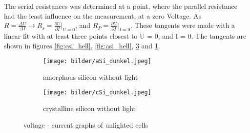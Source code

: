 The serial resistances was determined at a point,
where the parallel resistance had the least influence on the measurement, at a zero Voltage.
As $R = \frac{\Delta U}{\Delta I} \rightarrow R_s = \frac{\partial U}{\partial I}|_{U = 0}$,
and $R_P = \frac{\partial U}{\partial I}|_{I = 0}$.
These tangents were made with a linear fit with at least three points closest to
U = 0, and I = 0.
The tangents are shown in figures \ref{fig:csi_hell}, \ref{fig:asi_hell}, \ref{fig:csi_dunkel} and \ref{fig:asi_dunkel}.
\begin{figure}[h]
  \centering
  \begin{subfigure}[b]{0.45\textwidth}
    \texttt{[image: bilder/aSi\_dunkel.jpeg]}
    \caption{amorphous silicon without light}
    \label{fig:asi_dunkel}
  \end{subfigure}
  \begin{subfigure}[b]{0.45\textwidth}
    \texttt{[image: bilder/cSi\_dunkel.jpeg]}
    \caption{crystalline silicon without light}
    \label{fig:csi_dunkel}
  \end{subfigure}
  \caption{voltage - current graphs of unlighted cells}
\end{figure}

